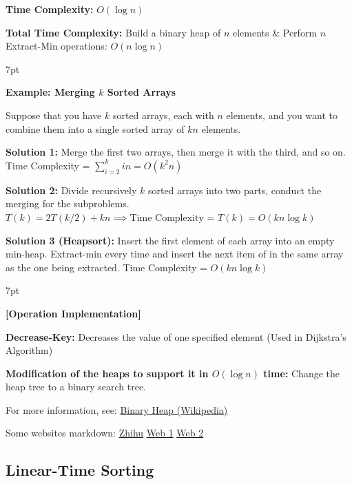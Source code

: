 \documentclass[10pt]{article}
\newenvironment{formal}[2]{%
	\def\FrameCommand{%
		\hspace{1pt}%
		{\color{#1}\vrule width 2pt}%
		{\color{#2}\vrule width 4pt}%
		\colorbox{#2}%
	}%
	\MakeFramed{\advance\hsize-\width\FrameRestore}%
	\noindent\hspace{-4.55pt}%
	\begin{adjustwidth}{}{7pt}%
		\vspace{2pt}\vspace{2pt}%
	}
	{%
		\vspace{2pt}\end{adjustwidth}\endMakeFramed%
}
\begin{document}
\textbf{Time Complexity:} $O(\log n)$

\textbf{Total Time Complexity:} Build a binary heap of $n$ elements \& Perform $n$ Extract-Min operations: $O(n\log n)$

\begin{formal}{Brown}{brownshade}
	
	\textbf{Example: Merging $k$ Sorted Arrays}
	
	Suppose that you have $k$ sorted arrays, each with $n$ elements, and you want to combine them into a single sorted array of $kn$ elements.

\textbf{Solution 1:} Merge the first two arrays, then merge it with the third, and so on. Time Complexity = $\sum_{i=2}^k in = O(k^2 n)$

\textbf{Solution 2:} Divide recursively $k$ sorted arrays into two parts, conduct the merging for the subproblems. $T(k) = 2T(k/2) + kn \implies \text{Time Complexity = }T(k) = O(kn\log k)$

\textbf{Solution 3 (Heapsort):} Insert the first element of each array into an empty min-heap. Extract-min every time and insert the next item of in the same array as the one being extracted. Time Complexity = $O(kn\log k)$

\end{formal}

\begin{formal}{Brown}{brownshade}

	\textbf{[Operation Implementation]}
	
	\textbf{Decrease-Key:} Decreases the value of one specified element (Used in Dijkstra's Algorithm)
	
	\textbf{Modification of the heaps to support it in $O(\log n)$ time:} Change the heap tree to a binary search tree.

\end{formal}

For more information, see: \href{https://en.wikipedia.org/wiki/Binary_heap}{Binary Heap (Wikipedia)}

Some websites markdown:
\href{https://www.zhihu.com/question/31387715}{Zhihu}
\href{http://www.matrix67.com/blog/archives/1209}{Web 1}
\href{http://www.matrix67.com/blog/archives/1523}{Web 2}


\newpage

\subsection{Linear-Time Sorting}
\end{document}
